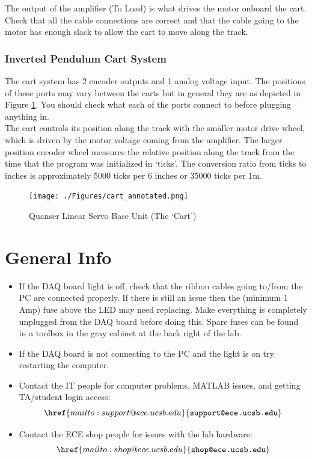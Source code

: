 \documentclass[11pt,letterpaper]{article}
\begin{document}
The output of the amplifier (To Load) is what drives the motor onboard the cart. Check that all the cable connections are correct and that the cable going to the motor has enough slack to allow the cart to move along the track. 

\subsubsection*{Inverted Pendulum Cart System}
The cart system has 2 encoder outputs and 1 analog voltage input. The positions of these ports may vary between the carts but in general they are as depicted in Figure \ref{fig:cart}. You should check what each of the ports connect to before plugging anything in. \\

The cart controls its position along the track with the smaller motor drive wheel, which is driven by the motor voltage coming from the amplifier. The larger position encoder wheel measures the relative position along the track from the time that the program was initialized in `ticks'. The conversion ratio from ticks to inches is approximately 5000 ticks per 6 inches or 35000 ticks per 1m.
\begin{figure}[H]
  \centering
  \texttt{[image: ./Figures/cart\_annotated.png]}
  \caption{Quanser Linear Servo Base Unit (The `Cart')}
  \label{fig:cart}
\end{figure}






\section*{General Info}
\begin{itemize}
  \item If the DAQ board light is off, check that the ribbon cables going to/from the PC are connected properly. If there is still an issue then the (minimum 1 Amp) fuse above the LED may need replacing. Make everything is completely unplugged from the DAQ board before doing this. Spare fuses can be found in a toolbox in the gray cabinet at the back right of the lab.
  \item If the DAQ board is not connecting to the PC and the light is on try restarting the computer.
  \item Contact the IT people for computer problems, MATLAB issues, and getting TA/student login access:
  \[\href{mailto:support@ece.ucsb.edu}{\texttt{support@ece.ucsb.edu}}\]
  \item Contact the ECE shop people for issues with the lab hardware:
  \[\href{mailto:shop@ece.ucsb.edu}{\texttt{shop@ece.ucsb.edu}}\]
\end{itemize}
\end{document}
